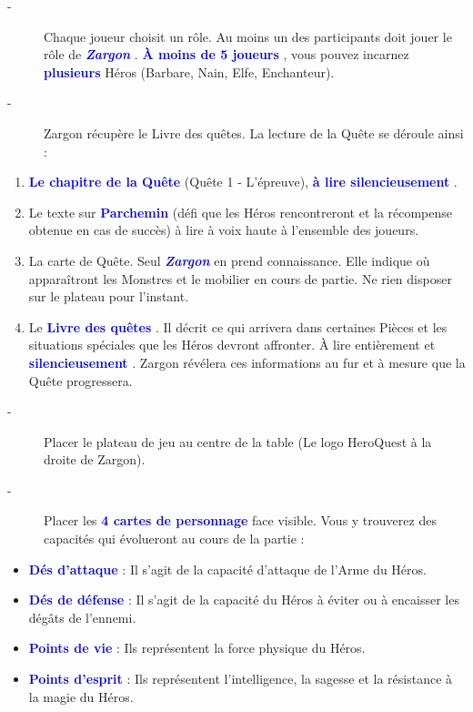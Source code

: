 \documentclass{scrartcl}%
\begin{document}
%
\begin{description}%
\item[{-} ]%
%
 Chaque joueur choisit un rôle. Au moins un des participants doit jouer le rôle de%
\textcolor{blue}{\textbf{\textit{ Zargon}}}%
.%
\textcolor{blue}{%
\textbf{ À moins de 5 joueurs}%
}%
, vous pouvez incarnez %
\textcolor{blue}{%
\textbf{plusieurs}%
}%
\textit{ }%
 Héros (Barbare, Nain, Elfe, Enchanteur).
%
\item[{-} ]%
%
 Zargon récupère le Livre des quêtes. La lecture de la Quête se déroule ainsi :
%
\end{description}%
\begin{enumerate}%
\item%
%
\textcolor{blue}{%
\textbf{Le chapitre de la Quête}%
}%
\textit{ }%
 (Quête 1 {-} L'épreuve), %
\textcolor{blue}{%
\textbf{à lire silencieusement}%
}%
.
%
\item%
%
 Le texte sur%
\textcolor{blue}{%
\textbf{ Parchemin}%
}%
\textit{ }%
 (défi que les Héros rencontreront et la récompense obtenue en cas de succès) à lire à voix haute à l'ensemble des joueurs.
%
\item%
%
 La carte de Quête. Seul %
\textcolor{blue}{\textbf{\textit{Zargon}}}%
\textit{ }%
 en prend connaissance. Elle indique où apparaîtront les Monstres et le mobilier en cours de partie. Ne rien disposer sur le plateau pour l'instant.
%
\item%
%
 Le %
\textcolor{blue}{%
\textbf{Livre des quêtes}%
}%
. Il décrit ce qui arrivera dans certaines Pièces et les situations spéciales que les Héros devront affronter. À lire entièrement et %
\textcolor{blue}{%
\textbf{silencieusement}%
}%
. Zargon révélera ces informations au fur et à mesure que la Quête progressera.
%
\end{enumerate}%
\begin{description}%
\item[{-} ]%
%
 Placer le plateau de jeu au centre de la table (Le logo HeroQuest à la droite de Zargon).
%
\item[{-} ]%
%
 Placer les %
\textcolor{blue}{%
\textbf{4 cartes de personnage}%
}%
\textit{ }%
 face visible. Vous y trouverez des capacités qui évolueront au cours de la partie :
%
\end{description}%
\begin{itemize}%
\item%
%
\textcolor{blue}{%
\textbf{ Dés d’attaque}%
}%
\textit{ }%
 : Il s'agit de la capacité d'attaque de l'Arme du Héros.
%
\item%
%
\textcolor{blue}{%
\textbf{Dés de défense}%
}%
\textit{ }%
 : Il s'agit de la capacité du Héros à éviter ou à encaisser les dégâts de l'ennemi.
%
\item%
%
\textcolor{blue}{%
\textbf{Points de vie}%
}%
\textit{ }%
 : Ils représentent la force physique du Héros.
%
\item%
%
\textcolor{blue}{%
\textbf{Points d'esprit}%
}%
\textit{ }%
 : Ils représentent l'intelligence, la sagesse et la résistance à la magie du Héros.
%
\end{itemize}%
\end{document}
